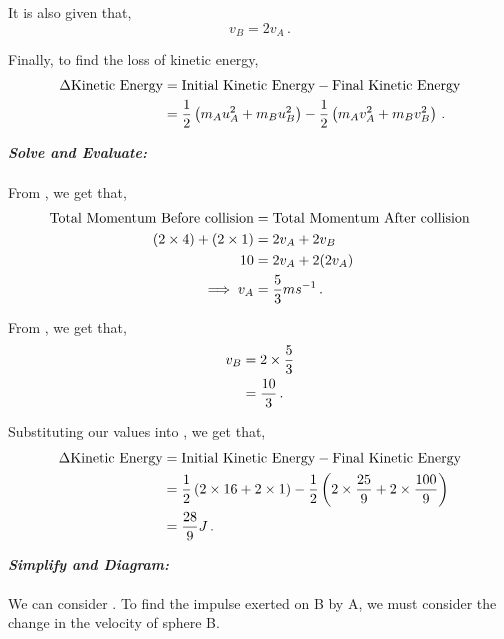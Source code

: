 \begin{subquestions}
\begin{subsubquestions}
It is also given that,
\begin{equation}
	v_B=2v_A \label{2008M:q5:Speed1} \,.
\end{equation}

Finally, to find the loss of kinetic energy,
\begin{align}
	\Delta \text{Kinetic Energy} & = \text{Initial Kinetic Energy} - \text{Final Kinetic Energy} \nonumber \\
	                             & = \frac{1}{2}\left(m_Au_A^2+m_Bu_B^2\right) - \frac{1}{2}\left(m_Av_A^2+m_Bv_B^2\right) \label{2008M:q5:KEEqn1} \,.
\end{align}



\textbf{\textit{Solve and Evaluate:}} \\ \\
From , we get that,
\begin{align}
	\text{Total Momentum Before collision} & = \text{Total Momentum After collision} \nonumber \\
	(2\times 4) + (2\times 1) & = 2v_A+2v_B \nonumber \\
	10 & = 2v_A+2(2v_A) \nonumber \\
	\implies v_A & = \frac{5}{3}ms^{-1} \,.
\end{align}
	
From , we get that,
\begin{align}
	v_B & = 2\times \frac{5}{3} \nonumber \\
	    & = \frac{10}{3} \,.
\end{align}
	
Substituting our values into , we get that,
\begin{align}
	\Delta \text{Kinetic Energy} & = \text{Initial Kinetic Energy} - \text{Final Kinetic Energy} \nonumber \\
								 & = \frac{1}{2}\left(2\times 16 + 2\times 1\right) - \frac{1}{2}\left(2\times \frac{25}{9}+ 2\times \frac{100}{9}\right) \nonumber \\
								 & = \frac{28}{9} J \,.
\end{align}
	

\subsubquestion

\textbf{\textit{Simplify and Diagram:}} \\ \\
We can consider . To find the impulse exerted on B by A, we must consider the change in the velocity of sphere B.





\end{subsubquestions}
\end{subquestions}

